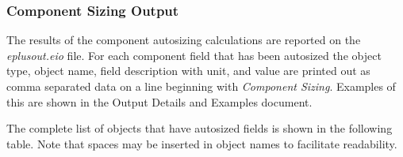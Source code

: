 \subsubsection{Component Sizing Output}\label{component-sizing-output}

The results of the component autosizing calculations are reported on the \emph{eplusout.eio} file. For each component field that has been autosized the object type, object name, field description with unit, and value are printed out as comma separated data on a line beginning with \emph{Component Sizing}. Examples of this are shown in the Output Details and Examples document.

The complete list of objects that have autosized fields is shown in the following table. Note that spaces may be inserted in object names to facilitate readability.

